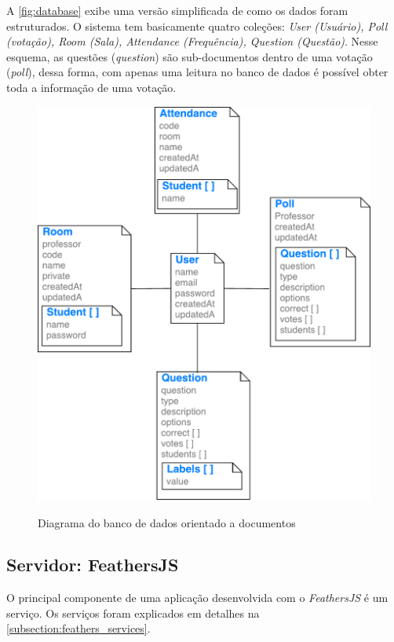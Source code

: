 A \autoref{fig:database} exibe uma versão simplificada de como os dados
foram estruturados. O sistema tem basicamente quatro coleções:
\textit{User (Usuário), Poll (votação), Room (Sala), Attendance (Frequência), Question (Questão)}.
Nesse esquema, as questões (\textit{question}) são sub-documentos dentro de uma votação (\textit{poll}), dessa forma,
com apenas uma leitura no banco de dados é possível obter toda a informação de uma votação.

\begin{figure}[!ht]
  \centering
  \caption{Diagrama do banco de dados orientado a documentos}
  \includegraphics[scale=0.75,valign=t]{imagens/database}
  \doautor
  \label{fig:database}
\end{figure}

\subsection{Servidor: FeathersJS}

O principal componente de uma aplicação desenvolvida com o \textit{FeathersJS} é um
serviço. Os serviços foram explicados em detalhes na \autoref{subsection:feathers_services}.

